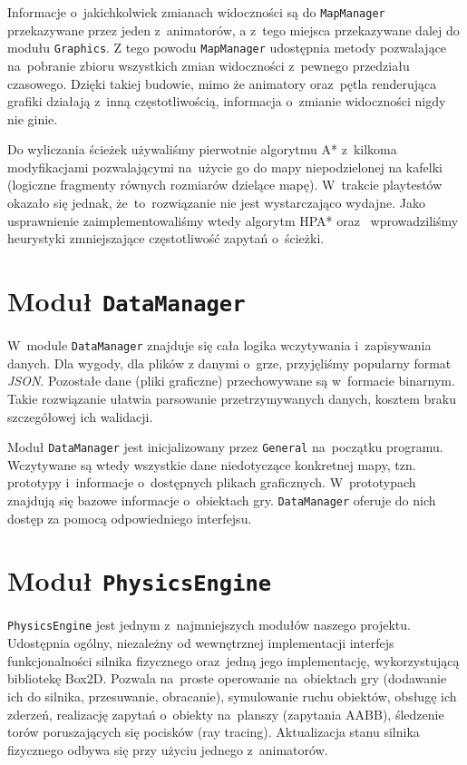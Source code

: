 \documentclass[licencjacka]{pracamgr}
\begin{document}
    Informacje o~jakichkolwiek zmianach widoczności są do \texttt{MapManager} przekazywane przez jeden z~animatorów, a z~tego miejsca
    przekazywane dalej do modułu \texttt{Graphics}. Z tego powodu \texttt{MapManager} udostępnia metody pozwalające na~pobranie
    zbioru wszystkich zmian widoczności z~pewnego przedziału czasowego. Dzięki takiej budowie, mimo że animatory oraz~pętla 
    renderująca grafiki działają z~inną częstotliwością, informacja o~zmianie widoczności nigdy nie ginie.

    Do wyliczania ścieżek używaliśmy pierwotnie algorytmu A*\cite{A*} z~kilkoma modyfikacjami pozwalającymi na~użycie go do mapy
    niepodzielonej na kafelki (logiczne fragmenty równych rozmiarów dzielące mapę). W~trakcie playtestów okazało się jednak,
    że~to~rozwiązanie nie jest wystarczająco wydajne. Jako usprawnienie zaimplementowaliśmy wtedy algorytm HPA*\cite{HPA} oraz~
    wprowadziliśmy heurystyki zmniejszające częstotliwość zapytań o~ścieżki.

  \section{Moduł \texttt{DataManager}}
    W~module \texttt{DataManager} znajduje się cała logika wczytywania i~zapisywania danych. Dla wygody, dla plików z
    danymi o~grze, przyjęliśmy popularny format \emph{JSON}. Pozostałe dane (pliki graficzne) przechowywane są w~formacie
    binarnym. Takie rozwiązanie ułatwia parsowanie przetrzymywanych danych, kosztem braku szczegółowej ich walidacji.

    Moduł \texttt{DataManager} jest inicjalizowany przez \texttt{General} na~początku programu. Wczytywane są wtedy wszystkie dane
    niedotyczące konkretnej mapy, tzn. prototypy i~informacje o~dostępnych plikach graficznych. W~prototypach znajdują się 
    bazowe informacje o~obiektach gry. \texttt{DataManager} oferuje do nich dostęp za pomocą odpowiedniego interfejsu.

  \section{Moduł \texttt{PhysicsEngine}}
    \texttt{PhysicsEngine} jest jednym z~najmniejszych modułów naszego projektu. Udostępnia ogólny, niezależny od
    wewnętrznej implementacji interfejs funkcjonalności silnika fizycznego oraz~jedną jego implementację, wykorzystującą bibliotekę Box2D.
    Pozwala na~proste operowanie na~obiektach gry (dodawanie ich do silnika, przesuwanie, obracanie), symulowanie ruchu obiektów,
    obsługę ich zderzeń, realizację zapytań o~obiekty na~planszy (zapytania AABB), śledzenie torów poruszających się pocisków (ray tracing).
    Aktualizacja stanu silnika fizycznego odbywa się przy użyciu jednego z~animatorów.
\end{document}
